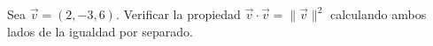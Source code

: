 Sea $\vec{v} = (2, -3, 6)$. Verificar la propiedad $\vec{v} \cdot \vec{v} = \|\vec{v}\|^2$ calculando ambos lados de la igualdad por separado.